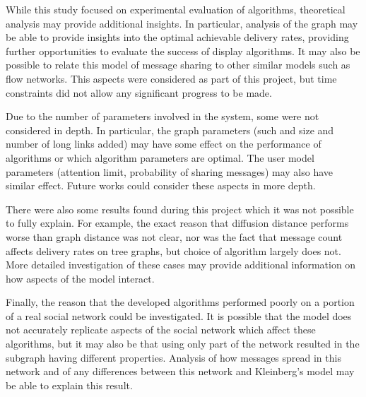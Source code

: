 \documentclass[bsc,frontabs,twoside,singlespacing,parskip,deptreport]{infthesis}     %
\begin{document}
While this study focused on experimental evaluation of algorithms, theoretical analysis may provide additional insights. In particular, analysis of the graph may be able to provide insights into the optimal achievable delivery rates, providing further opportunities to evaluate the success of display algorithms. It may also be possible to relate this model of message sharing to other similar models such as flow networks. This aspects were considered as part of this project, but time constraints did not allow any significant progress to be made.

Due to the number of parameters involved in the system, some were not considered in depth.
In particular, the graph parameters (such and size and number of long links added) may have some effect on the performance of algorithms or which algorithm parameters are optimal. The user model parameters (attention limit, probability of sharing messages) may also have similar effect. Future works could consider these aspects in more depth.

There were also some results found during this project which it was not possible to fully explain. For example, the exact reason that diffusion distance performs worse than graph distance was not clear, nor was the fact that message count affects delivery rates on tree graphs, but choice of algorithm largely does not. More detailed investigation of these cases may provide additional information on how aspects of the model interact.

Finally, the reason that the developed algorithms performed poorly on a portion of a real social network could be investigated. It is possible that the model does not accurately replicate aspects of the social network which affect these algorithms, but it may also be that using only part of the network resulted in the subgraph having different properties. Analysis of how messages spread in this network and of any differences between this network and Kleinberg's model may be able to explain this result.



\end{document}
